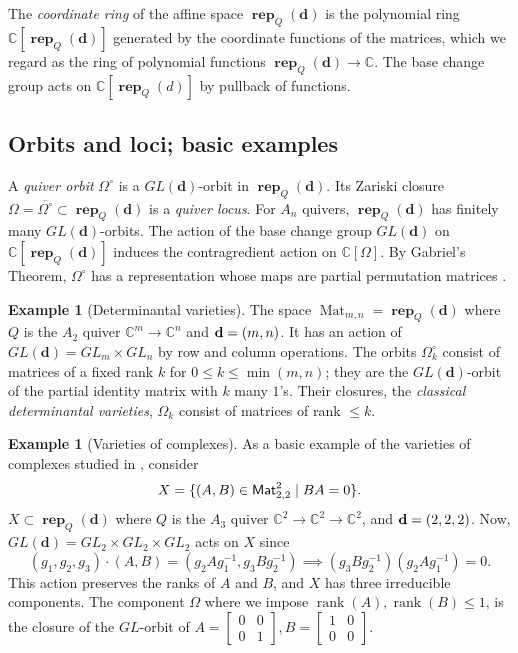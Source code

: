 \documentclass[12pt]{amsart}
\renewcommand{\d}{\mathbf{d}}
\DeclareMathOperator{\rep}{\mathbf{rep}}
\DeclareMathOperator{\rank}{\operatorname{rank}}
\newcommand{\C}{\mathbb C}
\theoremstyle{definition}
\newtheorem{example}[theorem]{Example}
\theoremstyle{remark}
\begin{document}
The \emph{coordinate ring} of the affine space $\rep_Q(\d)$ is the polynomial ring $\C[\rep_Q(\d)]$ generated by the coordinate functions of the matrices, which we regard as the ring of polynomial functions $\rep_Q(\d)\to \C$. The base change group acts on $\C[\rep_Q(d)]$ by pullback of functions.

\subsection{Orbits and loci; basic examples}

A \emph{quiver orbit} $\Omega^\circ$ is a $GL(\mathbf d)$-orbit in $\rep_Q(\mathbf d)$.
Its Zariski closure 
$\Omega=\overline{\Omega^\circ}\subset \rep_Q(\mathbf d)$
is a \emph{quiver locus}.
For $A_n$ quivers, $\rep_Q(\mathbf d)$ has finitely many $GL(\mathbf d)$-orbits. 
The action of the base change group $GL(\d)$ on $\C[\rep_Q(\d)]$ induces the contragredient action on $\C[\Omega]$.
By Gabriel's Theorem, $\Omega^{\circ}$ has a representation whose maps are partial permutation matrices \cite{KKR}. 

\begin{example}[Determinantal varieties]
The space $\operatorname {Mat}_{m,n}=\rep_Q(\d)$ 
where $Q$ is the $A_2$ quiver ${\mathbb C}^m{\longrightarrow}
{\mathbb C}^n$ and ${\bf d}=(m,n)$. 
It has an action of 
${GL}(\d)=GL_m\times GL_n$ by row and column operations. 
The orbits $\Omega^{\circ}_k$ 
consist of matrices of a fixed rank $k$ for $0\leq k\leq \min(m,n)$; they are the 
$GL(\d)$-orbit of the partial identity matrix with $k$ many $1$'s.
Their
closures, the \emph{classical determinantal varieties}, 
${\Omega}_k$ consist of matrices of rank $\leq k$. 
\end{example}

\begin{example}[Varieties of complexes]\label{exa:BE-details}
As a basic example of the varieties of complexes studied in \cite{Strickland}, consider
\[X=\{(A,B)\in {\sf Mat}_{2,2}^2\mid BA=0\}.\]
$X\subset \rep_Q(\d)$ where $Q$ is the $A_3$ quiver 
${\mathbb C}^2{\longrightarrow} {\mathbb C}^2 {\longrightarrow} {\mathbb C}^2$,
and ${\bf d}=(2,2,2)$. 
Now, ${GL}(\d)=GL_2\times GL_2\times
GL_2$ acts on $X$ since 
\[(g_1,g_2,g_3)\cdot(A,B)=(g_2 A g_1^{-1},
g_3 B g_2^{-1}) \implies (g_3 B g_2^{-1})(g_2A g_1^{-1})=0.\] 
This action preserves
the ranks of $A$ and $B$, and $X$ has three irreducible components. The component $\Omega$ where
we impose $\rank(A),\rank(B)\leq 1$, is the closure of the $GL$-orbit of 
$A=\left[\begin{smallmatrix}
0 & 0 \\
0 & 1
\end{smallmatrix}\right], B=\left[\begin{smallmatrix} 1 & 0 \\ 0 & 0 \end{smallmatrix}\right]$. 
\end{example}
\end{document}
